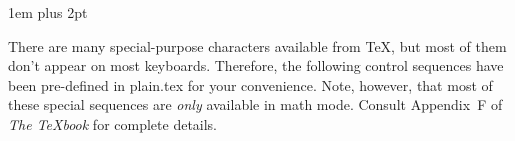 %
{
%
%
%

\def\ctr#1{\hss#1\hss}
\def\\{\char `\\}
\def\v{\vrule height 20pt depth 10pt width 0pt}
\tabskip 1em
\parskip 6pt plus 2pt
\abovedisplayskip 0pt
\belowdisplayskip 0pt
\def\dcolumn#1{$\vcenter
               {
                \halign{\v$\ctr{##}$&$\displaystyle\ctr{##}$&{\tt ##}\cr#1}
               }$
             }
\def\column#1{$\vcenter
               {
                \halign{$\ctr{##}$&{\tt ##}\cr#1}
               }$
             }
\def\sect#1{\penalty-1000
            \vskip 12pt plus 6pt
            {\sl #1}
            \vskip 4pt
            \penalty9999\ignorespaces}

There are many special-purpose characters available from \TeX, but most of
them don't appear on most keyboards.  Therefore, the following control
sequences have been pre-defined in plain.tex for your convenience.
Note, however, that most of these special sequences are {\sl only\/}
available in math mode.  Consult Appendix~F of {\sl The \TeX book\/}
for complete details.

}
